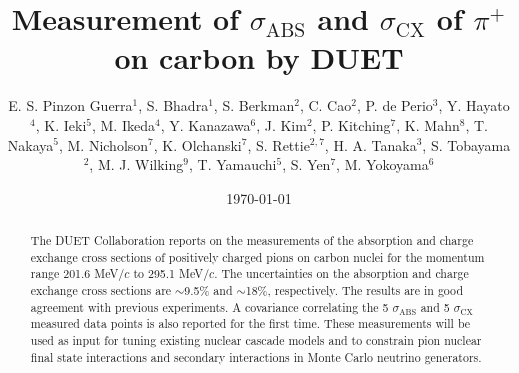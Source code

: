 \documentclass[%
 reprint,
showpacs,
 amsmath,amssymb,
 aps,
 prc,
]{revtex4-1}
\begin{document}
\title{Measurement of $\sigma_{\mathrm{ABS}}$ and $\sigma_{\mathrm{CX}}$ of $\pi^+$ on carbon by DUET}%

\author{E. S. Pinzon Guerra$^1$, S. Bhadra$^1$, S. Berkman$^2$, C. Cao$^2$, P. de Perio$^3$, Y. Hayato$^4$, K. Ieki$^5$, M. Ikeda$^4$, Y. Kanazawa$^6$,  J. Kim$^2$, P. Kitching$^7$, K. Mahn$^8$, T. Nakaya$^5$,  M. Nicholson$^7$, K. Olchanski$^7$, S. Rettie$^{2,7}$, H. A. Tanaka$^3$, S. Tobayama$^2$, M. J. Wilking$^9$, T. Yamauchi$^5$, S. Yen$^7$, M. Yokoyama$^6$}

%


\date{\today}%

\begin{abstract}

The DUET Collaboration reports on the measurements of the absorption and charge exchange cross sections of positively charged pions on carbon nuclei for the momentum range 201.6 MeV$/c$ to 295.1 MeV$/c$. The uncertainties on the absorption and charge exchange cross sections are $\sim$9.5\% and $\sim$18\%, respectively. The results are in good agreement with previous experiments. A covariance correlating the 5 $\sigma_{\mathrm{ABS}}$ and 5 $\sigma_{\mathrm{CX}}$ measured data points is also reported for the first time. These measurements will be used as input for tuning existing nuclear cascade models and to constrain pion nuclear final state interactions and secondary interactions in Monte Carlo neutrino generators.

\end{abstract}
\end{document}
